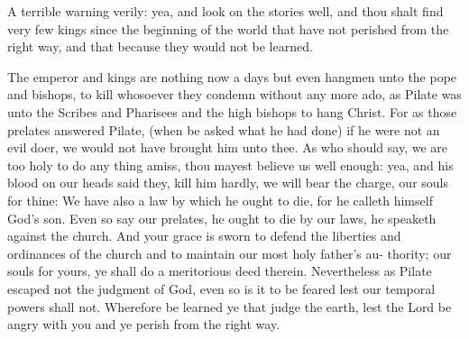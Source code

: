 \documentclass{custom}
\begin{document}
A terrible warning verily: yea, and look on the stories 
well, and thou shalt find very few kings since the beginning 
of the world that have not perished from the right way, and 
that because they would not be learned. 

The emperor and kings are nothing now a days but even 
hangmen unto the pope and bishops, to kill whosoever 
they condemn without any more ado, as Pilate was unto the 
Scribes and Pharisees and the high bishops to hang Christ. 
For as those prelates answered Pilate, (when be asked 
what he had done) if he were not an evil doer, we would 
not have brought him unto thee. As who should say, we 
are too holy to do any thing amiss, thou mayest believe us 
well enough: yea, and his blood on our heads said they, kill 
him hardly, we will bear the charge, our souls for thine: 
We have also a law by which he ought to die, for he calleth 
himself God's son. Even so say our prelates, he ought to 
die by our laws, he speaketh against the church. And 
your grace is sworn to defend the liberties and ordinances 
of the church and to maintain our most holy father's au- 
thority; our souls for yours, ye shall do a meritorious deed 
therein. Nevertheless as Pilate escaped not the judgment of 
God, even so is it to be feared lest our temporal powers shall 
not. Wherefore be learned ye that judge the earth, lest the 
Lord be angry with you and ye perish from the right way. 
\end{document}
